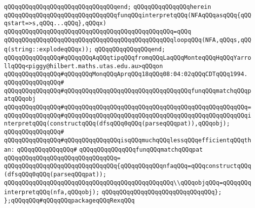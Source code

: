 \verb|qQQqqQQqqQQqqQQqqQQqqQQqqQQqqQQqend;|\newline
\newline
\verb|qQQqqQQqqQQqqQQqherein|\newline
\newline
\verb|qQQqqQQqqQQqqQQqqQQqqQQqqQQqqQQqfunqQQqinterpretqQQq(NFAqQQqasqQQq{qQQqstart=>s,qQQq...qQQq},qQQqx)|\newline
\verb|qQQqqQQqqQQqqQQqqQQqqQQqqQQqqQQqqQQqqQQqqQQqqQQq=qQQq|\newline
\verb|qQQqqQQqqQQqqQQqqQQqqQQqqQQqqQQqqQQqqQQqqQQqqQQqloopqQQq(NFA,qQQqs,qQQq(string::explodeqQQqx));|\newline
\verb|qQQqqQQqqQQqqQQqend;|\newline
\newline
\newline
\verb|qQQqqQQqqQQqqQQq#qQQqqQQqAqQQqtipqQQqfromqQQqLaqQQqMonteqQQqHqQQqYarrollqQQq<piggy@hilbert.maths.utas.edu.au>qQQqon|\newline
\verb|qQQqqQQqqQQqqQQq#qQQqqQQqMonqQQqAprqQQq18qQQq08:04:02qQQqCDTqQQq1994.|\newline
\verb|qQQqqQQqqQQqqQQq#|\newline
\verb|qQQqqQQqqQQqqQQq#qQQqqQQqqQQqqQQqqQQqqQQqqQQqqQQqqQQqfunqQQqmatchqQQqpatqQQqobj|\newline
\verb|qQQqqQQqqQQqqQQq#qQQqqQQqqQQqqQQqqQQqqQQqqQQqqQQqqQQqqQQqqQQqqQQqqQQq=|\newline
\verb|qQQqqQQqqQQqqQQq#qQQqqQQqqQQqqQQqqQQqqQQqqQQqqQQqqQQqqQQqqQQqqQQqqQQqinterpretqQQq(constructqQQq(dfsqQQq0qQQq(parseqQQqpat)),qQQqobj);|\newline
\verb|qQQqqQQqqQQqqQQq#|\newline
\verb|qQQqqQQqqQQqqQQq#qQQqqQQqqQQqqQQqisqQQqmuchqQQqlessqQQqefficientqQQqthan:|\newline
\verb|qQQqqQQqqQQqqQQq#|\newline
\verb|qQQqqQQqqQQqqQQqfunqQQqmatchqQQqpat|\newline
\verb|qQQqqQQqqQQqqQQqqQQqqQQqqQQqqQQq=|\newline
\verb|qQQqqQQqqQQqqQQqqQQqqQQqqQQqqQQq{qQQqqQQqqQQqnfaqQQq=qQQqconstructqQQq(dfsqQQq0qQQq(parseqQQqpat));|\newline
\newline
\verb|qQQqqQQqqQQqqQQqqQQqqQQqqQQqqQQqqQQqqQQqqQQqqQQq\\qQQqobjqQQq=qQQqqQQqinterpretqQQq(nfa,qQQqobj);|\newline
\verb|qQQqqQQqqQQqqQQqqQQqqQQqqQQqqQQq};|\newline
\newline
\newline
\newline
\verb|};qQQqqQQq#qQQqqQQqpackageqQQqRexqQQq|\newline
\newline
\newline
\newline
\newline
\newline
\newline

